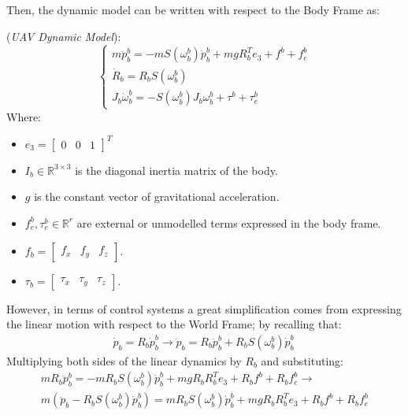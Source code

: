 Then, the dynamic model can be written with respect to the Body Frame as:
\begin{definition}\label{UAV_dyn_model_def}
    (\textit{UAV Dynamic Model}):
    \begin{equation}
        \begin{cases}\label{UAV_dyn_model}
            m\ddot{p}_{b}^{b}=-mS\left(\omega_{b}^{b}\right)\dot{p}_{b}^{b}+mgR_{b}^{T}e_{3}+f^b+f_{e}^b\\
            \dot{R}_{b}=R_{b}S\left(\omega_b^b\right)\\
            J_{b}\dot{\omega}_{b}^{b}=-S\left(\omega_b^b\right)J_{b}\omega_{b}^{b}+\tau^b+\tau_{e}^b
        \end{cases}
    \end{equation}
    Where:
    \begin{itemize}
        \item $e_3=\begin{bmatrix} 0 & 0 & 1\end{bmatrix}^{T}$\\
        \item $I_b\in\mathbb{R}^{3\times 3}$ is the diagonal inertia matrix of the body.
        \item $g$ is the constant vector of gravitational acceleration.
        \item $f_{e}^{b},\tau_{e}^{b}\in\mathbb{R}^{r}$ are external or unmodelled terms expressed in the body frame.
        \item $f_b= \begin{bmatrix}f_x & f_y & f_z \end{bmatrix}$.
        \item $\tau_b= \begin{bmatrix}\tau_x & \tau_y & \tau_z \end{bmatrix}$.
    \end{itemize}
\end{definition}
However, in terms of control systems a great simplification comes from expressing the linear motion with respect to the World Frame; by recalling that:
\begin{gather*}
    \dot{p}_b=R_b\dot{p}_{b}^{b}\rightarrow \ddot{p}_{b}=R_b\ddot{p}_{b}^{b}+R_bS\left(\omega_{b}^{b}\right)\dot{p}_{b}^{b}\
\end{gather*}
Multiplying both sides of the linear dynamics by $R_b$ and substituting:
\begin{gather*}
    mR_b\ddot{p}_b^b=-mR_bS\left(\omega_b^b\right)\dot{p}_b^b+mgR_bR_b^Te_3+R_bf^b+R_bf_e^b\rightarrow\\
    m\left(\ddot{p}_b-R_bS\left(\omega_b^b\right)\dot{p}_b^b\right)=mR_bS\left(\omega_b^b\right)\dot{p}_b^b+mgR_bR_b^Te_3+R_bf^b+R_bf_e^b
\end{gather*}
